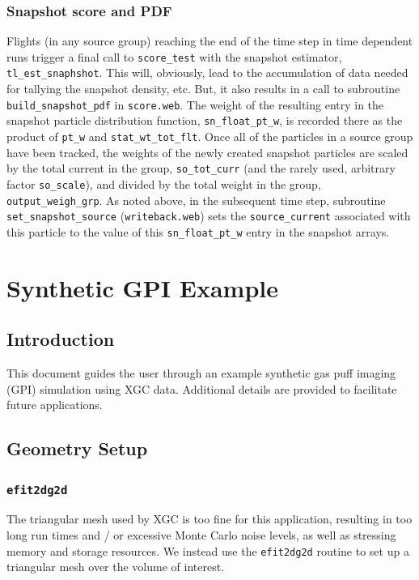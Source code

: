 \documentclass[12pt]{report}
\begin{document}
\subsection{Snapshot score and PDF}

Flights (in any source group)
reaching the end of the time step in time dependent runs
trigger a final call to {\tt score\_test} with the snapshot
estimator, {\tt tl\_est\_snaphshot}.  This will, obviously, lead
to the accumulation of data needed for tallying the snapshot density, etc.
But, it also results in a call to subroutine {\tt build\_snapshot\_pdf}
in {\tt score.web}.  The weight of the resulting entry in the
snapshot particle distribution function,
{\tt sn\_float\_pt\_w}, is recorded there as
the product of {\tt pt\_w} and {\tt stat\_wt\_tot\_flt}.  Once
all of the particles in a source group have been tracked,
the weights of the newly created snapshot particles are
scaled by the total current in the group, {\tt so\_tot\_curr}
(and the rarely used, arbitrary factor {\tt so\_scale}), and 
divided by the total weight in the group, {\tt output\_weigh\_grp}.
As noted above, in the subsequent time step, 
subroutine {\tt set\_snapshot\_source} ({\tt writeback.web})
sets the {\tt source\_current}
associated with this particle to the value of this {\tt sn\_float\_pt\_w}
entry in the snapshot arrays.

\chapter{Synthetic GPI Example}

\section{Introduction}

This document guides the user through an example
synthetic gas puff imaging (GPI)
simulation using XGC data.  Additional
details are provided to facilitate future applications.


\section{Geometry Setup}

\subsection{\tt efit2dg2d}
\label{efit2dg2d}

The triangular mesh used by XGC is too fine 
for this application, resulting in too long run times and /
or excessive Monte Carlo noise levels, as well as stressing memory
and storage resources.  We instead use the
{\tt efit2dg2d} routine to set up a triangular mesh over the
volume of interest.
\end{document}
